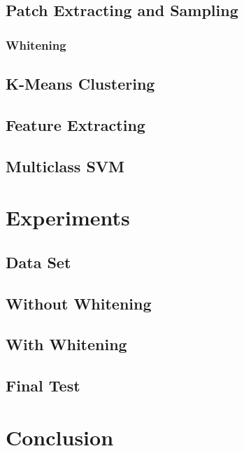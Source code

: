 \documentclass{acm_proc_article-sp}
\begin{document}
\subsection{Patch Extracting and Sampling}
\subsubsection{Whitening}

\subsection{K-Means Clustering}

\subsection{Feature Extracting}

\subsection{Multiclass SVM}

\section{Experiments}

\subsection{Data Set}

\subsection{Without Whitening}

\subsection{With Whitening}

\subsection{Final Test}

\section{Conclusion}

\nocite{*}

 

\balancecolumns
\end{document}
